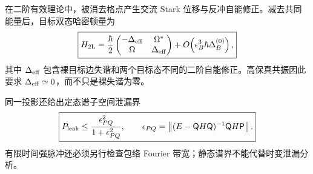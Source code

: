 在二阶有效理论中，被消去格点产生交流 Stark 位移与反冲自能修正。减去共同能量后，目标双态哈密顿量为
\begin{equation}
\boxed{
H_{2\rm L}
=\frac{\hbar}{2}
\begin{pmatrix}
-\Delta_{\rm eff}&\Omega^*\\
\Omega&\Delta_{\rm eff}
\end{pmatrix}
+O\!\left(\epsilon_B^3\hbar\Delta_B^{(0)}\right),}
\label{eq:recoil_effective_two_level}
\end{equation}
其中 $\Delta_{\rm eff}$ 包含裸目标边失谐和两个目标态不同的二阶自能修正。高保真共振因此要求 $\Delta_{\rm eff}\simeq0$，而不只是裸失谐为零。

同一投影还给出定态谱子空间泄漏界
\begin{equation}
\boxed{
P_{\rm leak}
\le\frac{\epsilon_{PQ}^2}{1+\epsilon_{PQ}^2},
\qquad
\epsilon_{PQ}
=\left\|(E-\mathsf QH\mathsf Q)^{-1}\mathsf QH\mathsf P\right\|.}
\label{eq:feshbach_stationary_leakage_bound}
\end{equation}
有限时间强脉冲还必须另行检查包络 Fourier 带宽；静态谱界不能代替时变泄漏分析。

